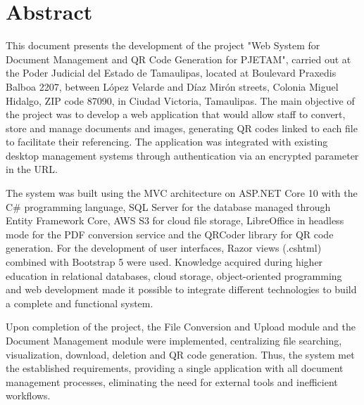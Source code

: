 \section{Abstract}
This document presents the development of the project "Web System for Document Management and QR Code Generation for PJETAM", carried out at the Poder Judicial del Estado de Tamaulipas, located at Boulevard Praxedis Balboa 2207, between López Velarde and Díaz Mirón streets, Colonia Miguel Hidalgo, ZIP code 87090, in Ciudad Victoria, Tamaulipas.
The main objective of the project was to develop a web application that would allow staff to convert, store and manage documents and images, generating QR codes linked to each file to facilitate their referencing. The application was integrated with existing desktop management systems through authentication via an encrypted parameter in the URL.

The system was built using the MVC architecture on ASP.NET Core 10 with the C\# programming language, SQL Server for the database managed through Entity Framework Core, AWS S3 for cloud file storage, LibreOffice in headless mode for the PDF conversion service and the QRCoder library for QR code generation. For the development of user interfaces, Razor views (.cshtml) combined with Bootstrap 5 were used. Knowledge acquired during higher education in relational databases, cloud storage, object-oriented programming and web development made it possible to integrate different technologies to build a complete and functional system.

Upon completion of the project, the File Conversion and Upload module and the Document Management module were implemented, centralizing file searching, visualization, download, deletion and QR code generation. Thus, the system met the established requirements, providing a single application with all document management processes, eliminating the need for external tools and inefficient workflows.